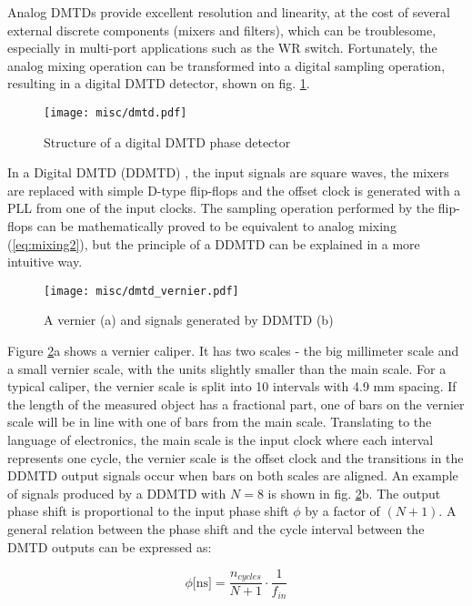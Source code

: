 Analog DMTDs provide excellent resolution and linearity, at the cost of several
external discrete components (mixers and filters), which can be troublesome,
especially in multi-port applications such as the WR switch. Fortunately, the
analog mixing operation can be transformed into a digital sampling operation,
resulting in a digital DMTD detector, shown on fig. \ref{fig:digital_dmtd}.
\begin{figure}[ht!]
  \centering
  \texttt{[image: misc/dmtd.pdf]}
  \caption{Structure of a digital DMTD phase detector}
  \label{fig:digital_dmtd}
\end{figure}
In a Digital DMTD (DDMTD) \cite{icalepcs09}, the input signals are square
waves, the mixers are replaced with simple D-type flip-flops and the offset
clock is generated with a PLL from one of the input clocks. The sampling
operation performed by the flip-flops can be mathematically proved to be
equivalent to analog mixing (\ref{eq:mixing2}), but the principle of a DDMTD
can be explained in a more intuitive way.
\begin{figure}[ht!]
  \centering
  \texttt{[image: misc/dmtd\_vernier.pdf]}
  \caption{A vernier (a) and signals generated by DDMTD (b)}
  \label{fig:dmtd_vernier}
\end{figure}
Figure \ref{fig:dmtd_vernier}a shows a vernier caliper. It has two scales -
the big millimeter scale and a small vernier scale, with the units slightly
smaller than the main scale. For a typical caliper, the vernier scale is split
into 10 intervals with 4.9 mm spacing. If the length of the measured object
has a fractional part, one of bars on the vernier scale will be in line with
one of bars from the main scale. Translating to the language of electronics,
the main scale is the input clock where each interval represents one cycle,
the vernier scale is the offset clock and the transitions in the DDMTD output
signals occur when bars on both scales are aligned. An example of signals
produced by a DDMTD with $N = 8$ is shown in fig. \ref{fig:dmtd_vernier}b. The
output phase shift is proportional to the input phase shift $\phi$ by a
factor of $(N+1)$. A general relation between the phase shift and the cycle
interval between the DMTD outputs can be expressed as:

\begin{equation}
\label{eq:dmtd1}
\phi \mbox{[ns]} = \frac{n_{cycles}}{N+1} \cdot \frac{1}{f_{in}}
\end{equation}


